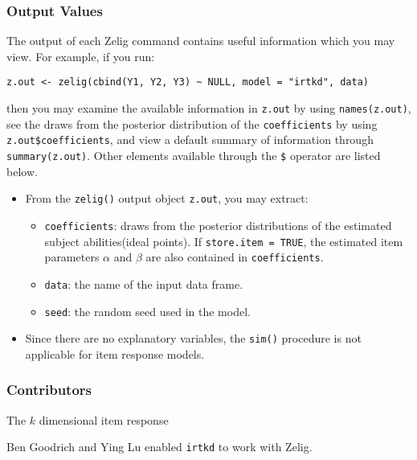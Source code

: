 \subsubsection{Output Values}

The output of each Zelig command contains useful information which you may
view. For example, if you run:
\begin{verbatim}
z.out <- zelig(cbind(Y1, Y2, Y3) ~ NULL, model = "irtkd", data)
\end{verbatim}
\noindent then you may examine the available information in \texttt{z.out} by
using \texttt{names(z.out)}, see the draws from the posterior distribution of
the \texttt{coefficients} by using \texttt{z.out\$coefficients}, and view 
a default summary of information through \texttt{summary(z.out)}. 
Other elements available through the \texttt{\$} operator are listed below.

\begin{itemize}

\item From the \texttt{zelig()} output object \texttt{z.out}, you may extract:

\begin{itemize}
\item \texttt{coefficients}: draws from the posterior distributions
of the estimated subject abilities(ideal points). If 
\texttt{store.item = TRUE}, the estimated item parameters $\alpha$ and $\beta$
 are also contained in \texttt{coefficients}.

\item \texttt{data}: the name of the input data frame.
\item \texttt{seed}: the random seed used in the model.   

\end{itemize}

\item Since there are no explanatory variables, the \texttt{sim()}
procedure is not applicable for item response models.

\end{itemize}

\subsubsection{Contributors}
The $k$ dimensional item response 

\noindent Ben Goodrich and Ying Lu enabled \texttt{irtkd} to work with Zelig.

